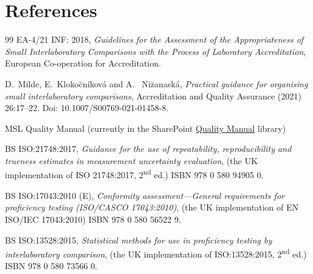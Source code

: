 \section*{References}

\begingroup
\renewcommand{\section}[2]{}%

\begin{thebibliography}{99}
 EA-4/21 INF: 2018, \textit{Guidelines for the Assessment of the Appropriateness of Small Interlaboratory Comparisons with the Process of Laboratory Accreditation}, European Co-operation for Accreditation.

 D.~Milde, E.~Kloko\u{c}n\'ikov\'a and A.~ Ni\u{z}anask\'a, \textit{Practical guidance for organising small interlaboratory comparisons}, Accreditation and Quality Assurance (2021) 26:17--22. Doi: 10.1007/S00769-021-01458-8.

 MSL Quality Manual (currently in the SharePoint \href{https://callaghaninnovationgovtnz.sharepoint.com/sites/bpa-msl-quality-management-system-scie/QualityManual/Forms/AllItems.aspx?viewid=cce925f2%2D7678%2D4e7c%2Da549%2Dd95f5c6af950&id=%2Fsites%2Fbpa%2Dmsl%2Dquality%2Dmanagement%2Dsystem%2Dscie%2FQualityManual%2FMSL%5FQuality%5FManual%2Epdf&parent=%2Fsites%2Fbpa%2Dmsl%2Dquality%2Dmanagement%2Dsystem%2Dscie%2FQualityManual}{Quality Manual} library)

 BS ISO:21748:2017, \textit{Guidance for the use of repeatability, reproducibility and trueness estimates in measurement uncertainty evaluation}, (the UK implementation of ISO 21748:2017, 2\textsuperscript{nd} ed.)  ISBN 978 0 580 94905 0.

 BS ISO:17043:2010 (E), \textit{Conformity assessment---General requirements for proficiency testing (ISO/CASCO 17043:2010)}, (the UK implementation of EN ISO/IEC 17043:2010) ISBN 978 0 580 56522 9.

 BS ISO:13528:2015, \textit{Statistical methods for use in proficiency testing by interlaboratory comparison}, (the UK implementation of ISO:13528:2015, 2\textsuperscript{nd} ed.) ISBN 978 0 580 73566 0.

\end{thebibliography}
\endgroup


